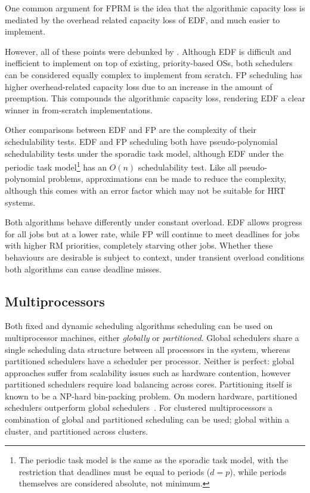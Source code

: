 One common argument for
\gls{FPRM} is the idea that the algorithmic capacity loss is mediated by the overhead related
capacity loss of \gls{EDF}, and much easier to implement. 

However, all of these points were debunked by \citet{Buttazzo_05}.  Although \gls{EDF} is difficult
and inefficient to implement on top of existing, priority-based \glspl{OS}, both schedulers
can be considered equally complex to implement from scratch.  \gls{FP} scheduling has higher
overhead-related capacity loss due to an increase in the amount of preemption.  This compounds the
algorithmic capacity loss, rendering \gls{EDF} a clear winner in from-scratch implementations.

Other comparisons between \gls{EDF} and \gls{FP} are the complexity of their schedulability tests.
\gls{EDF} and \gls{FP} scheduling both have pseudo-polynomial
schedulability tests under the sporadic task model, although \gls{EDF} under the periodic task
model\footnote{The periodic task model is the same as the sporadic task model, with the restriction
that deadlines must be equal to periods ($d = p$), while periods themselves are considered absolute,
not minimum.} has an $O(n)$ schedulability test.  Like all pseudo-polynomial problems,
approximations can be made to reduce the complexity, although this comes with an error factor which
may not be suitable for \gls{HRT} systems.  

Both algorithms behave differently under constant
overload. \gls{EDF} allows progress for all jobs but at a lower rate, while \gls{FP} will
continue to meet deadlines for jobs with higher \gls{RM} priorities, completely starving other
jobs. Whether these behaviours are desirable is subject to context, under
transient overload conditions both algorithms can cause deadline misses.


\subsection{Multiprocessors}

Both fixed and dynamic scheduling algorithms scheduling can be used on multiprocessor machines, either
\emph{globally} or \emph{partitioned}. Global schedulers share a single scheduling data structure
between all processors in the system, whereas partitioned schedulers have a scheduler per processor.
Neither is perfect: global approaches suffer from scalability issues such as hardware contention,
however partitioned schedulers require load balancing across cores.  Partitioning itself is known to
be a NP-hard bin-packing problem.  On modern hardware, partitioned schedulers outperform global
schedulers~\citep{Brandenburg:phd}.  For clustered multiprocessors a combination of global and
partitioned scheduling can be used; global within a cluster, and partitioned across clusters.

